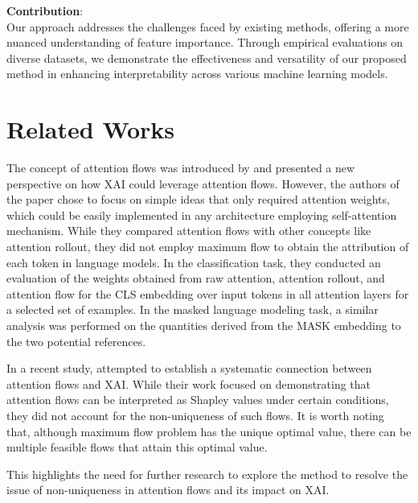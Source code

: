 \documentclass{article} %
\theoremstyle{bfnote}
\newcommand{\adddetail}[2]{\todo[inline, inlinewidth=5cm, author=#2, color=lightpurple]{#1}}
\newcommand{\dcheck}[2]{\todo[inline, inlinewidth=5cm, author=#2, color=neonblue]{#1}}
\begin{document}
\textbf{Contribution}:\\ 
Our approach addresses the challenges faced by existing methods, offering a more nuanced understanding of feature importance. Through empirical evaluations on diverse datasets, we demonstrate the effectiveness and versatility of our proposed method in enhancing interpretability across various machine learning models.

\dcheck{Quality of Writing}{Max}
\adddetail{Our Contributions?}{Behrooz+Max}



\section{Related Works}
The concept of attention flows was introduced by \cite{abnar2020b} and presented a new perspective on how XAI could leverage attention flows. However, the authors of the paper chose to focus on simple ideas that only required attention weights, which could be easily implemented in any architecture employing self-attention mechanism. While they compared attention flows with other concepts like attention rollout, they did not employ maximum flow to obtain the attribution of each token in language models. In the classification task, they conducted an evaluation of the weights obtained from raw attention, attention rollout, and attention flow for the CLS embedding over input tokens in all attention layers for a selected set of examples. In the masked language modeling task, a similar analysis was performed on the quantities derived from the MASK embedding to the two potential references.

In a recent study, \cite{ethayarajh2021b} attempted to establish a systematic connection between attention flows and XAI. While their work focused on demonstrating that attention flows can be interpreted as Shapley values under certain conditions, they did not account for the non-uniqueness of such flows. It is worth noting that, although maximum flow problem has the unique optimal value, there can be multiple feasible flows that attain this optimal value. 

This highlights the need for further research to explore the method to resolve the issue of non-uniqueness in attention flows and its impact on XAI.
\end{document}
